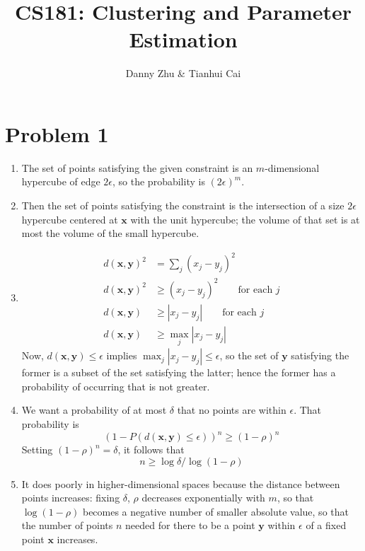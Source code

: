 \documentclass{article}
\title{CS181: Clustering and Parameter Estimation}
\author{Danny Zhu \& Tianhui Cai}
\let\b\mathbf
\begin{document}
\maketitle

\section*{Problem 1}
\begin{enumerate}
\item The set of points satisfying the given constraint is an
  $m$-dimensional hypercube of edge $2\epsilon$, so the probability is
  $(2\epsilon)^m$.
\item Then the set of points satisfying the constraint is the
  intersection of a size $2\epsilon$ hypercube centered at $\mathbf x$
  with the unit hypercube; the volume of that set is at most the
  volume of the small hypercube.
\item
  \begin{align*}
    d(\b x,\b y)^2&=\sum_j(x_j-y_j)^2\\
    d(\b x,\b y)^2&\ge(x_j-y_j)^2\qquad\textrm{for each $j$}\\
    d(\b x,\b y)&\ge|x_j-y_j|\qquad\textrm{for each $j$}\\
    d(\b x,\b y)&\ge\max_j|x_j-y_j|
  \end{align*}
  Now, $d(\b x,\b y)\le\epsilon$ implies $\max_j|x_j-y_j|\le\epsilon$,
  so the set of $\b y$ satisfying the former is a subset of the set
  satisfying the latter; hence the former has a probability of
  occurring that is not greater.
\item We want a probability of at most $\delta$ that no points are
  within $\epsilon$. That probability is
  \[(1-P(d(\mathbf x,\mathbf y)\leq \epsilon))^n\geq (1-\rho)^n\]
  Setting $(1-\rho)^n=\delta$, it follows that
  \[n\geq \log \delta / \log(1-\rho)\]
\item It does poorly in higher-dimensional spaces because the distance
  between points increases: fixing $\delta$, $\rho$ decreases
  exponentially with $m$, so that $\log(1-\rho)$ becomes a negative
  number of smaller absolute value, so that the number of points $n$
  needed for there to be a point $\mathbf y$ within $\epsilon$ of a
  fixed point $\mathbf x$ increases.
\end{enumerate}
\end{document}
